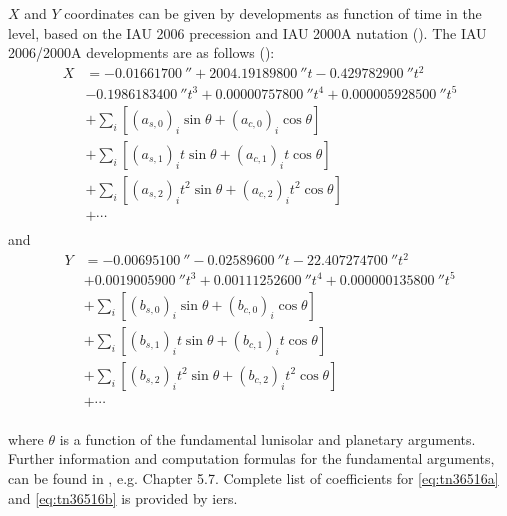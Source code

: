 $X$ and $Y$ coordinates can be given by developments as function of time in the 
\si{\micro\larcsecond} level, based on the IAU 2006 precession and IAU 2000A
nutation (\cite{Capitaine2006}).
The IAU 2006/2000A developments are as follows (\cite{iers2010}):
\begin{equation}
  \label{eq:tn36516a}
  \begin{aligned}
  X &= \SI{-0.01661700}{\arcsecond} + \SI{2004.19189800}{\arcsecond} t - \SI{0.429782900}{\arcsecond} t^2 \\
  &- \SI{0.1986183400}{\arcsecond}t^3 + \SI{0.00000757800}{\arcsecond} t^4 + \SI{0.000005928500}{\arcsecond} t^5 \\
  &+ \sum_{i} \left[ (a_{s,0})_i \sin \theta + (a_{c,0})_i \cos \theta \right] \\ 
  &+ \sum_{i} \left[ (a_{s,1})_i t \sin \theta + (a_{c,1})_i t \cos \theta \right] \\ 
  &+ \sum_{i} \left[ (a_{s,2})_i t^2 \sin \theta + (a_{c,2})_i t^2 \cos \theta \right] \\ 
  &+ \cdots \\
  \end{aligned}
\end{equation}
and
\begin{equation}
  \label{eq:tn36516b}
  \begin{aligned}
  Y &= -\SI{0.00695100}{\arcsecond} - \SI{0.02589600}{\arcsecond} t - \SI{22.407274700}{\arcsecond} t^2 \\
  &+ \SI{0.0019005900}{\arcsecond} t^3 + \SI{0.00111252600}{\arcsecond} t^4 + \SI{0.000000135800}{\arcsecond} t^5 \\
  &+ \sum_{i} \left[ (b_{s,0})_i \sin \theta     + (b_{c,0})_i \cos \theta \right] \\ 
  &+ \sum_{i} \left[ (b_{s,1})_i t \sin \theta   + (b_{c,1})_i t \cos \theta \right] \\ 
  &+ \sum_{i} \left[ (b_{s,2})_i t^2 \sin \theta + (b_{c,2})_i t^2 \cos \theta \right] \\ 
  &+ \cdots \\
  \end{aligned}
\end{equation}

where $\theta$ is a function of the fundamental lunisolar and planetary arguments.
Further information and computation formulas for the fundamental arguments, 
can be found in \cite{iers2010}, e.g. Chapter 5.7. Complete 
list of coefficients for \autoref{eq:tn36516a} and \autoref{eq:tn36516b} is provided 
by \gls{iers}. 

